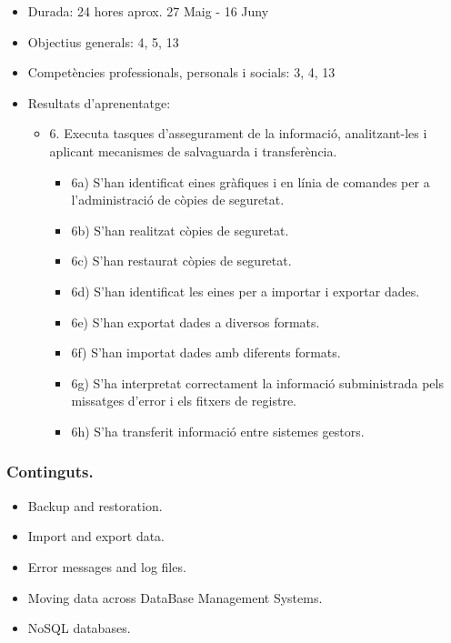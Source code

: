 \documentclass[catalan, a4paper, 12pt, titlepage]{article}
\begin{document}
  \begin{itemize}
	\item Durada: 24 hores aprox. 27 Maig - 16 Juny
	\item Objectius generals: 4, 5, 13
	\item Competències professionals, personals i socials: 3, 4, 13
	\item Resultats d'aprenentatge: 
		\begin{itemize}
			\item 6. Executa tasques d'assegurament de la informació, analitzant-les i aplicant mecanismes de salvaguarda i transferència.
				\begin{itemize}
					\item 6a) S'han identificat eines gràfiques i en línia de comandes per a l'administració de còpies de seguretat.
					\item 6b) S'han realitzat còpies de seguretat.
					\item 6c) S'han restaurat còpies de seguretat.
					\item 6d) S'han identificat les eines per a importar i exportar dades.
					\item 6e) S'han exportat dades a diversos formats.
					\item 6f) S'han importat dades amb diferents formats.
					\item 6g) S'ha interpretat correctament la informació subministrada pels missatges d'error i els fitxers de registre.
					\item 6h) S'ha transferit informació entre sistemes gestors.
				\end{itemize}
		\end{itemize}
  \end{itemize}

  \subsubsection{Continguts.}
  \begin{itemize}
	\item Backup and restoration.
	\item Import and export data.
	\item Error messages and log files.
	\item Moving data across DataBase Management Systems.
	\item NoSQL databases.
  \end{itemize}
\end{document}
